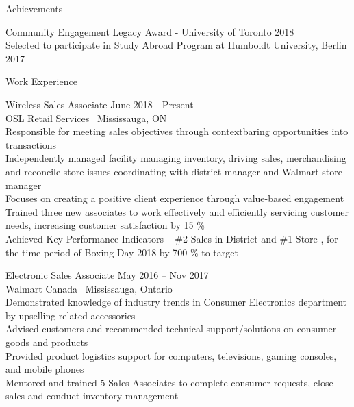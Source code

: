 \documentclass{article}
\begin{document}
\begin{center}
    \large  \textcolor{ablue}{Achievements}
   \end{center}
   
\indent Community Engagement Legacy Award - University of Toronto
\hfill 2018
\\\indent Selected to participate in Study Abroad Program at Humboldt University, Berlin                 
\hfill 2017


\newpage

\begin{center}
  \large  \textcolor{ablue}{Work Experience}
\end{center}


\noindent Wireless Sales Associate                                                          
\hfill June 2018 - Present 
\\ \noindent OSL Retail Services  \textbar \  Mississauga, ON                  
\\Responsible for meeting sales objectives through contextbaring opportunities into transactions
\\Independently managed facility managing inventory, driving sales, merchandising and reconcile store issues  coordinating with district manager and Walmart store manager 
\\Focuses on creating a positive client experience through value-based engagement
\\Trained three new associates to work effectively and efficiently servicing customer needs, increasing customer satisfaction by 15 \%
\\Achieved Key Performance Indicators – \#2 Sales in District and  \#1 Store , for the time period of Boxing Day 2018 by 700 \% to target

\bigskip


\noindent Electronic Sales Associate                                                                
\hfill May 2016 – Nov 2017 
\\ \noindent Walmart Canada  \textbar \  Mississauga, Ontario                 
\\Demonstrated knowledge of industry trends in Consumer Electronics department by upselling  related accessories
\\Advised customers and recommended technical support/solutions on consumer goods and products
\\Provided product logistics support for computers, televisions, gaming consoles, and mobile phones 
\\Mentored and trained 5 Sales Associates to complete consumer requests, close sales and conduct inventory management 
\end{document}
